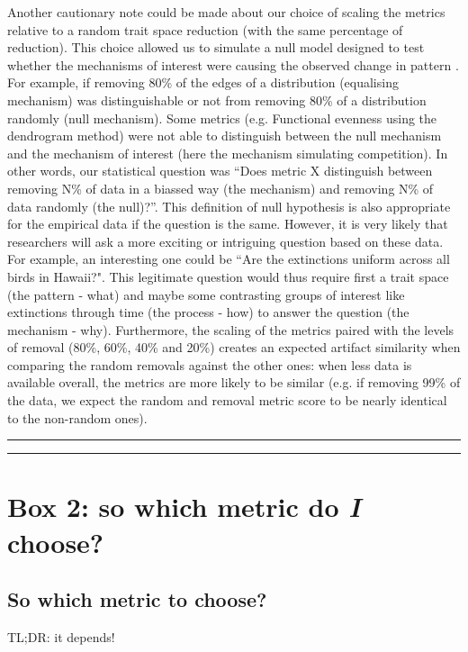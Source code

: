 \documentclass[12pt,letterpaper]{article}
\begin{document}
Another cautionary note could be made about our choice of scaling the metrics relative to a random trait space reduction (with the same percentage of reduction).
This choice allowed us to simulate a null model designed to test whether the mechanisms of interest were causing the observed change in pattern \citep{bausman2018modeling}.
For example, if removing 80\% of the edges of a distribution (equalising mechanism) was distinguishable or not from removing 80\% of a distribution randomly (null mechanism).
Some metrics (e.g. Functional evenness using the dendrogram method) were not able to distinguish between the null mechanism and the mechanism of interest (here the mechanism simulating competition).
In other words, our statistical question was ``Does metric X distinguish between removing N\% of data in a biassed way (the mechanism) and removing N\% of data randomly (the null)?''.
This definition of null hypothesis is also appropriate for the empirical data if the question is the same.
However, it is very likely that researchers will ask a more exciting or intriguing question based on these data.
For example, an interesting one could be ``Are the extinctions uniform across all birds in Hawaii?".
This legitimate question would thus require first a trait space (the pattern - what) and maybe some contrasting groups of interest like extinctions through time (the process - how) to answer the question (the mechanism - why).
Furthermore, the scaling of the metrics paired with the levels of removal (80\%, 60\%, 40\% and 20\%) creates an expected artifact similarity when comparing the random removals against the other ones: when less data is available overall, the metrics are more likely to be similar (e.g. if removing 99\% of the data, we expect the random and removal metric score to be nearly identical to the non-random ones).


\bigskip
\bigskip
\hrule
\hrule

\section*{Box 2: so which metric do \textit{I} choose?}
\subsection{So which metric to choose?}

TL;DR: it depends!
\end{document}
